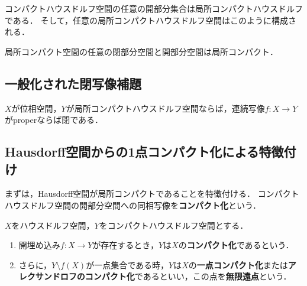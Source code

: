 \documentclass[uplatex,dvipdfmx]{jsreport}
\begin{document}
\begin{example}[コンパクトハウスドルフ空間の開部分集合は局所コンパクト]
    コンパクトハウスドルフ空間の任意の開部分集合は局所コンパクトハウスドルフである．
    そして，任意の局所コンパクトハウスドルフ空間はこのように構成される．
\end{example}

\begin{example}[局所コンパクト性は弱遺伝的である]
    局所コンパクト空間の任意の閉部分空間と開部分空間は局所コンパクト．
\end{example}

\subsection{一般化された閉写像補題}

\begin{proposition}[一般化された閉写像補題]
    $X$が位相空間，$Y$が局所コンパクトハウスドルフ空間ならば，連続写像$f:X\to Y$がproperならば閉である．
\end{proposition}

\subsection{Hausdorff空間からの1点コンパクト化による特徴付け}

\begin{tcolorbox}[colframe=ForestGreen, colback=ForestGreen!10!white,breakable,colbacktitle=ForestGreen!40!white,coltitle=black,fonttitle=\bfseries\sffamily,
title=]
    まずは，Hausdorff空間が局所コンパクトであることを特徴付ける．
    コンパクトハウスドルフ空間の開部分空間への同相写像を\textbf{コンパクト化}という．
\end{tcolorbox}

\begin{definition}
    $X$をハウスドルフ空間，$Y$をコンパクトハウスドルフ空間とする．
    \begin{enumerate}
        \item 開埋め込み$f:X\to Y$が存在するとき，$Y$は$X$の\textbf{コンパクト化}であるという．
        \item さらに，$Y\setminus f(X)$が一点集合である時，$Y$は$X$の\textbf{一点コンパクト化}または\textbf{アレクサンドロフのコンパクト化}であるといい，この点を\textbf{無限遠点}という．
    \end{enumerate}
\end{definition}
\end{document}
